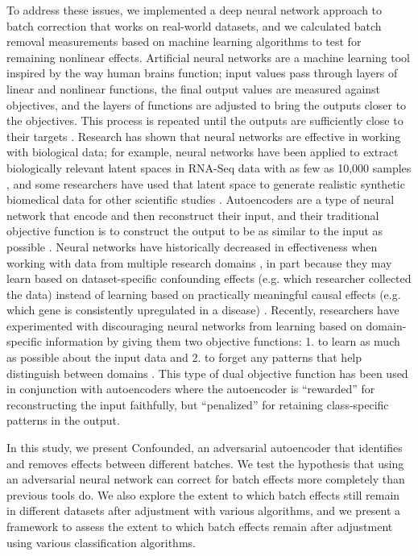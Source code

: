 \documentclass[notitlepage]{article}
\begin{document}
To address these issues, we implemented a deep neural network approach to batch correction that works on real-world datasets, and we calculated batch removal measurements based on machine learning algorithms to test for remaining nonlinear effects.
Artificial neural networks are a machine learning tool inspired by the way human brains function; input values pass through layers of linear and nonlinear functions, the final output values are measured against objectives, and the layers of functions are adjusted to bring the outputs closer to the objectives.
This process is repeated until the outputs are sufficiently close to their targets \citep{schmidhuber_deep_2015}.
Research has shown that neural networks are effective in working with biological data; for example, neural networks have been applied to extract biologically relevant latent spaces in RNA-Seq data with as few as 10,000 samples \citep{way_extracting_2017}, and some researchers have used that latent space to generate realistic synthetic biomedical data for other scientific studies \citep{beaulieu-jones_privacy-preserving_2017}.
Autoencoders are a type of neural network that encode and then reconstruct their input, and their traditional objective function is to construct the output to be as similar to the input as possible \citep{hinton_reducing_2006}.
Neural networks have historically decreased in effectiveness when working with data from multiple research domains \citep{ganin_domain-adversarial_2015}, in part because they may learn based on dataset-specific confounding effects (e.g. which researcher collected the data) instead of learning based on practically meaningful causal effects (e.g. which gene is consistently upregulated in a disease) \citep{louizos_causal_2017-2}.
Recently, researchers have experimented with discouraging neural networks from learning based on domain-specific information by giving them two objective functions:
1. to learn as much as possible about the input data and
2. to forget any patterns that help distinguish between domains \citep{ganin_domain-adversarial_2015,tzeng_deep_2014-2}.
This type of dual objective function has been used in conjunction with autoencoders \citep{louizos_variational_2015} where the autoencoder is ``rewarded'' for reconstructing the input faithfully, but ``penalized'' for retaining class-specific patterns in the output.

In this study, we present Confounded, an adversarial autoencoder that identifies and removes effects between different batches.
We test the hypothesis that using an adversarial neural network can correct for batch effects more completely than previous tools do.
We also explore the extent to which batch effects still remain in different datasets after adjustment with various algorithms, and we present a framework to assess the extent to which batch effects remain after adjustment using various classification algorithms.
\end{document}
